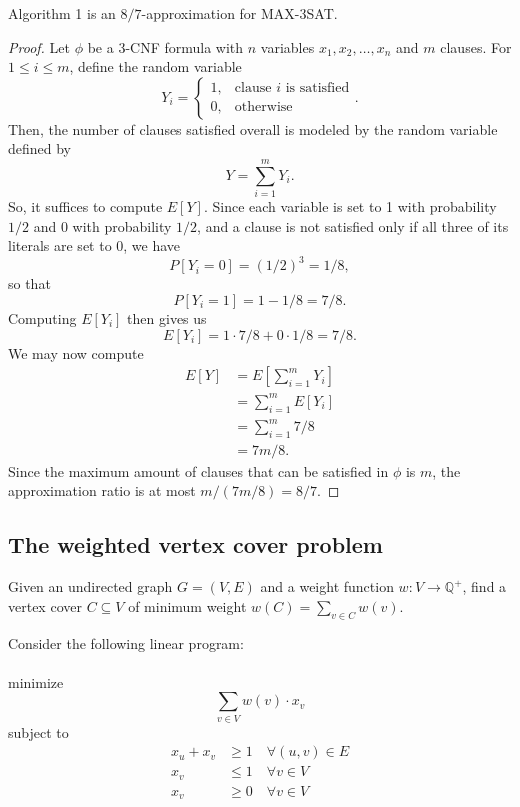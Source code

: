 \documentclass{article}
\newcommand{\Q}{\mathbb{Q}}
\newenvironment{theorem}[2][Theorem]{\begin{trivlist}
\item[\hskip \labelsep {\bfseries #1}\hskip \labelsep {\bfseries #2.}]}{\end{trivlist}}
\newenvironment{envsection}[1]{\begin{trivlist}
\item[\hskip \labelsep {\bfseries #1}]}{\end{trivlist}}
\begin{document}
\begin{theorem}{2.1}{}
    Algorithm 1 is an $8/7$-approximation for MAX-3SAT.

    \begin{proof}
        Let $\phi$ be a 3-CNF formula with $n$ variables $x_1,x_2,\dots,x_n$ and $m$ clauses. For $1 \leq i \leq m$, define the random variable
        \[
        Y_i =
        \begin{cases}
            1, &\text{clause $i$ is satisfied}\\
            0, &\text{otherwise}
        \end{cases}.
        \]
        Then, the number of clauses satisfied overall is modeled by the random variable defined by
        \[
        Y = \sum_{i=1}^m Y_i.
        \]
        So, it suffices to compute $E[Y]$. Since each variable is set to 1 with probability $1/2$ and 0 with probability $1/2$, and a clause is not satisfied only if all three of its literals are set to 0, we have
        \[
        P[Y_i = 0] = (1/2)^3 = 1/8,
        \]
        so that
        \[
        P[Y_i = 1] = 1 - 1/8 = 7/8.
        \]
        Computing $E[Y_i]$ then gives us
        \[
        E[Y_i] = 1 \cdot 7/8 + 0 \cdot 1/8 = 7/8.
        \]
        We may now compute
        \begin{align*}
            E[Y] &= E \left[ \sum_{i=1}^m Y_i \right]\\
            &= \sum_{i=1}^{m} E[Y_i]\\
            &= \sum_{i=1}^{m} 7/8\\
            &= 7m/8.
        \end{align*}
        Since the maximum amount of clauses that can be satisfied in $\phi$ is $m$, the approximation ratio is at most $m/(7m/8) = 8/7$.
    \end{proof}
\end{theorem}

\subsection{The weighted vertex cover problem}

\begin{envsection}{Optimization Problem (Minimum Weight Vertex Cover)}
    Given an undirected graph $G = (V,E)$ and a weight function $w: V \to \Q^+$, find a vertex cover $C \subseteq V$ of minimum weight $w(C) = \sum_{v \in C} w(v)$.
\end{envsection}

Consider the following linear program:\\
\\
minimize 
$$\displaystyle \sum_{v \in V}w(v) \cdot x_v$$
subject to
\begin{align*}
    x_u + x_v &\geq 1 \quad \forall (u,v) \in E\\
    x_v &\leq 1 \quad \forall v \in V\\
    x_v &\geq 0 \quad \forall v \in V
\end{align*}
\end{document}

